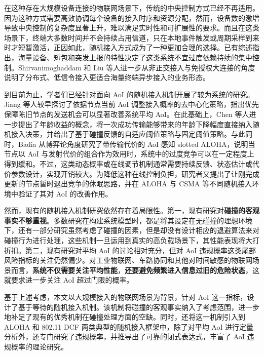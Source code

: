 在这种存在大规模设备连接的物联网场景下，传统的中央控制方式已经不再适用\cite{shahin2018performance}。因为这种方式需要高效协调每个设备的接入时序和资源分配，然而，设备数的激增导致中央控制的复杂度显著上升，难以满足实时性和可扩展性的要求。而且在这类场景下，终端大多数时间并不会持续占用信道，只在本地事件触发或周期采样到来时才短暂激活\cite{wang2019introduction}，正因如此，随机接入方式成为了一种更加合理的选择。已有综述指出，海量设备、短包和突发上报的特性决定了这类系统不宜过度依赖持续的集中控制\cite{iiyambo2024survey}。Shirvanimoghaddam 和 Liu 等人进一步从非正交接入与免授权大连接的角度说明了分布式、低信令接入更适合海量终端异步接入的业务形态\cite{shirvanimoghaddam2017massive,liu2018sparse}。

到目前为止，学者们已经针对面向 AoI 的随机接入机制开展了较为系统的研究。Jiang 等人较早探讨了依据节点当前 AoI 调整接入概率的去中心化策略，指出优先保障陈旧节点的发送机会可以显著改善系统平均 AoI\cite{jiang2018can}。在此基础上，Chen 等人进一步提出了年龄收益的概念，将一次成功传输能够带来的年龄下降幅度直接纳入随机接入决策，并给出了基于碰撞反馈的自适应阈值策略与固定阈值策略\cite{chen2022age}。与此同时，Badia 从博弈论角度研究了带传输代价的 AoI 感知 slotted ALOHA，说明当节点以 AoI 与发射代价的组合作为效用时，系统中的过度竞争可以在一定程度上得到缓和\cite{badia2021impact}。不过，这类动态概率或在线调节机制通常需要持续反馈、状态估计或代价参数设计，实现开销较大。为降低这种在线控制负担，研究者又提出了让刚完成更新的节点暂时退出竞争的休眠思路，并在 ALOHA 与 CSMA 等不同随机接入环境中验证了其对 AoI 的改善作用\cite{atabay2020improving,yavascan2021analysis,maatouk2020age}。

然而，现有的随机接入机制研究依然存在着局限性。第一，现有研究对\textbf{碰撞的客观事实不够重视}。多数研究在构建系统模型时，都是将其设定在无碰撞的理想环境下，还有一部分研究虽然考虑了碰撞的因素，但是却没有设计相应的退避算法来对碰撞行为进行处理，这些机制一旦运用到真实的高负载场景下，其性能表现将大打折扣。第二，现有研究对平均 AoI 的讨论相对充分，但对 AoI 违规概率这类尾部风险指标的关注仍然偏少。对工业物联网、车路协同和其他对时间敏感的物联网场景而言，\textbf{系统不仅需要关注平均性能}，\textbf{还要避免频繁进入信息过旧的危险状态}，这就要求进一步关注 AoI 超过门限的概率。

基于上述考虑，本文以大规模接入的物联网场景为背景，针对 AoI 这一指标，设计了基于等待的随机接入机制。该机制将碰撞的客观事实纳入了考虑范围，进一步地补足了现有的优秀机制在碰撞处理方面的空缺。同时，还将这一机制引入到 ALOHA 和 802.11 DCF 两类典型的随机接入框架中，除了对平均 AoI 进行定量分析外，还专门研究了违规概率，并推导出了可靠的闭式表达式，丰富了 AoI 违规概率的理论研究。

